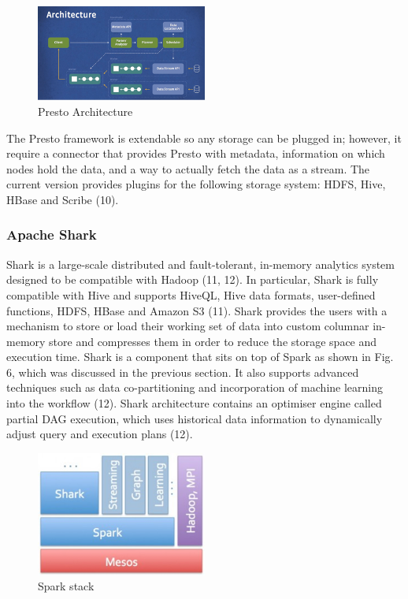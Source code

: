 \begin{figure}[H]
\centering
\includegraphics[width=0.5\textwidth]{Figures/presto.png}
\caption{Presto Architecture}\label{fig-serving-presto}
\end{figure}

The Presto framework is extendable so any storage can be plugged in; however, it require a connector that provides Presto with metadata, information on which nodes hold the data, and a way to actually fetch the data as a stream. The current version provides plugins for the following storage system: HDFS, Hive, HBase and Scribe (10).

\subsubsection{Apache Shark} \label{subsubsec-lr-servinglayer-shark}
Shark is a large-scale distributed and fault-tolerant, in-memory analytics system designed to be compatible with Hadoop (11, 12). In particular, Shark is fully compatible with Hive and supports HiveQL, Hive data formats, user-defined functions, HDFS, HBase and Amazon S3 (11). Shark provides the users with a mechanism to store or load their working set of data into custom columnar in-memory store and compresses them in order to reduce the storage space and execution time. Shark is a component that sits on top of Spark as shown in Fig. 6, which was discussed in the previous section. It also supports advanced techniques such as data co-partitioning and incorporation of machine learning into the workflow (12). Shark architecture contains an optimiser engine called partial DAG execution, which uses historical data information to dynamically adjust query and execution plans (12).

\begin{figure}[H]
\centering
\includegraphics[width=0.5\textwidth]{Figures/shark.png}
\caption{Spark stack}\label{fig-serving-shark}
\end{figure}

